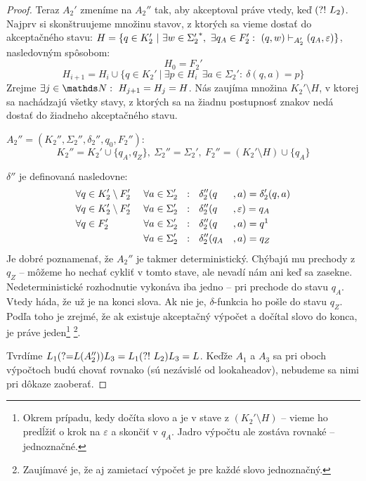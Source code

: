 \begin{proof}
Teraz $A_2'$ zmeníme na $A_2''$ tak, aby akceptoval práve vtedy, keď $\text{(?!~} L_2)$. Najprv si skonštruujeme množinu stavov, z ktorých sa vieme dostať do akceptačného stavu: $H=\nobreak\lbrace  q \in K_2'~|~ \exists w \in {\Sigma_2'}^*, ~ \exists q_A \in F_2': ~ (q,w)\vdash_{A_2'}(q_A,\varepsilon) \rbrace $, nasledovným spôsobom: $$ H_0 = F_2' $$ 
$$H_{i+1} = H_i \cup \lbrace q \in K_2'~|~ \exists p \in H_i ~~ \exists a \in \Sigma_2': ~ \delta(q,a)=p \rbrace$$
Zrejme $\exists j \in \N: ~ H_{j+1}=H_j = H$. Nás zaujíma množina $K_2' \setminus H$, v ktorej sa nachádzajú všetky stavy, z ktorých sa na žiadnu postupnosť znakov nedá dostať do žiadneho akceptačného stavu.

$A_2''= (K_2'',\Sigma_2'',\delta_2'',q_{0},F_2'')$: $$K_2'' = K_2' \cup \lbrace q_A, q_Z \rbrace, ~\Sigma_2'' = \Sigma_2', ~F_2'' = (K_2'\setminus H) \cup \lbrace q_A \rbrace$$

$\delta''$ je definovaná nasledovne: 
\begin{alignat*}{4}
 & \forall q \in K_2' \setminus F_2'  &~ \forall a \in \Sigma_2' ~&~:~~  \delta_2''(q&&,a)=\delta_2'(q,a) \\
 & \forall q \in K_2' \setminus F_2'  &~ \forall a \in \Sigma_2' ~&~:~~  \delta_2''(q&&,\varepsilon)=q_A \\
 & \forall q \in F_2' &~ \forall a \in \Sigma_2' ~&~:~~ \delta_2''(q&&,a)=q \footnotemark \\
 & ~ & ~\forall a \in \Sigma_2' ~&~:~~ \delta_2''(q_A&&,a)=q_Z 
\end{alignat*}
Je dobré poznamenať, že $A_2''$ je takmer deterministický. Chýbajú mu prechody z $q_Z$ -- môžeme ho nechať cykliť v tomto stave, ale nevadí nám ani keď sa zasekne. Nedeterministické rozhodnutie vykonáva iba jedno -- pri prechode do stavu $q_A$. Vtedy háda, že už je na konci slova. Ak nie je, $\delta$-funkcia ho pošle do stavu $q_Z$. Podľa toho je zrejmé, že ak existuje akceptačný výpočet a dočítal slovo do konca, je práve jeden\footnote{Okrem prípadu, kedy dočíta slovo a je v stave z $(K_2'\setminus H)$ -- vieme ho predĺžiť o krok na $\varepsilon$ a skončiť v $q_A$. Jadro výpočtu ale zostáva rovnaké -- jednoznačné.} \footnote{Zaujímavé je, že aj zamietací výpočet je pre každé slovo jednoznačný.}.

Tvrdíme $ L_1\text{(?=} L(A_2''))L_3 =L_1\text{(?!~} L_2)L_3= L $.
Keďže $A_1$ a $A_3$ sa pri oboch výpočtoch budú chovať rovnako (sú nezávislé od lookaheadov), nebudeme sa nimi pri dôkaze zaoberať.


\end{proof}
